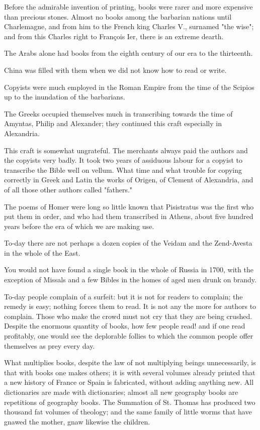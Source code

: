 Before the admirable invention of printing, books were rarer and more
expensive than precious stones. Almost no books among the barbarian
nations until Charlemagne, and from him to the French king Charles V.,
surnamed "the wise"; and from this Charles right to François Ier, there
is an extreme dearth.

The Arabs alone had books from the eighth century of our era to the
thirteenth.

China was filled with them when we did not know how to read or write.

Copyists were much employed in the Roman Empire from the time of the
Scipios up to the inundation of the barbarians.

The Greeks occupied themselves much in transcribing towards the time of
Amyntas, Philip and Alexander; they continued this craft especially in
Alexandria.

This craft is somewhat ungrateful. The merchants always paid the authors
and the copyists very badly. It took two years of assiduous labour for a
copyist to transcribe the Bible well on vellum. What time and what
trouble for copying correctly in Greek and Latin the works of Origen, of
Clement of Alexandria, and of all those other authors called "fathers."

The poems of Homer were long so little known that Pisistratus was the
first who put them in order, and who had them transcribed in Athens,
about five hundred years before the era of which we are making use.

To-day there are not perhaps a dozen copies of the Veidam and the
Zend-Avesta in the whole of the East.

You would not have found a single book in the whole of Russia in 1700,
with the exception of Missals and a few Bibles in the homes of aged men
drunk on brandy.

To-day people complain of a surfeit: but it is not for readers to
complain; the remedy is easy; nothing forces them to read. It is not any
the more for authors to complain. Those who make the crowd must not cry
that they are being crushed. Despite the enormous quantity of books, how
few people read! and if one read profitably, one would see the
deplorable follies to which the common people offer themselves as prey
every day.

What multiplies books, despite the law of not multiplying beings
unnecessarily, is that with books one makes others; it is with several
volumes already printed that a new history of France or Spain is
fabricated, without adding anything new. All dictionaries are made with
dictionaries; almost all new geography books are repetitions of
geography books. The Summation of St. Thomas has produced two thousand
fat volumes of theology; and the same family of little worms that have
gnawed the mother, gnaw likewise the children.




